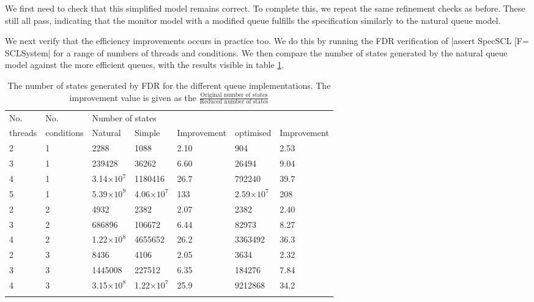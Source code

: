We first need to check that this simplified model remains correct. To complete this, we repeat the same refinement checks as before. These still all pass, indicating that the monitor model with a modified queue fulfills the specification similarly to the natural queue model.

We next verify that the efficiency improvements occurs in practice too. We do this by running the FDR verification of |assert SpecSCL [F= SCLSystem| for a range of numbers of threads and conditions. We then compare the number of states generated by the natural queue model against the more efficient queues, with the results visible in table \ref{table::queue}.

\def\thickhline{\noalign{\hrule height 1.5pt}}

\begin{table}
  \renewcommand*{\arraystretch}{1.2}
  \caption{The number of states generated by FDR for the different queue implementations. The improvement value is given as the $\frac{\text{Original number of states}}{\text{Reduced number of states}}$}
    \begin{tabularx}{\linewidth}{|l|l|X|X|X|X|X|}
      \thickhline
      No.&No.& \multicolumn{5}{l|}{Number of states} \\
      threads&conditions& Natural & Simple & Improvement & optimised & Improvement\\
      \thickhline
      2 & 1 & 2288 & 1088 & 2.10& 904 & 2.53\\ \hline
      3 & 1 & 239428 & 36262 & 6.60& 26494 & 9.04 \\ \hline
      4 & 1 & 3.14$\times\text{10}^\text{7}$ & 1180416 & 26.7& 792240 & 39.7\\ \hline
      5 & 1 & 5.39$\times\text{10}^\text{9}$ & 4.06$\times\text{10}^\text{7}$ & 133& 2.59$\times\text{10}^\text{7}$ &208 \\
      \thickhline
      2 & 2 & 4932 & 2382 & 2.07& 2382 & 2.40\\ \hline
      3 & 2 & 686896 & 106672 & 6.44& 82973 & 8.27\\ \hline
      4 & 2 & 1.22$\times\text{10}^\text{8}$ & 4655652 & 26.2& 3363492 & 36.3\\ 
      \thickhline
      2 & 3 & 8436 & 4106 & 2.05& 3634 & 2.32\\ \hline
      3 & 3 & 1445008 & 227512 & 6.35 & 184276 & 7.84\\ \hline
      4 & 3 & 3.15$\times\text{10}^\text{8}$ & 1.22$\times\text{10}^\text{7}$ & 25.9& 9212868 & 34.2\\ 
      \thickhline
    \end{tabularx}
    \label{table::queue}
  \end{table}

